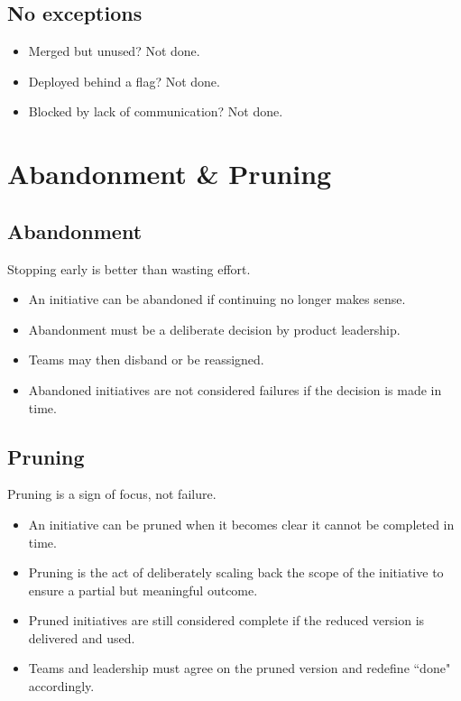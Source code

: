 \documentclass[a4paper]{article}
\begin{document}
\subsection*{No exceptions}

\begin{itemize}
    \item Merged but unused? Not done.
    \item Deployed behind a flag? Not done.
    \item Blocked by lack of communication? Not done.
\end{itemize}


\section{Abandonment \& Pruning}

\subsection*{Abandonment}
Stopping early is better than wasting effort.

\begin{itemize}
    \item An initiative can be abandoned if continuing no longer makes sense.
    \item Abandonment must be a deliberate decision by product leadership.
    \item Teams may then disband or be reassigned.
    \item Abandoned initiatives are not considered failures if the decision is made in time.
\end{itemize}

\subsection*{Pruning}

Pruning is a sign of focus, not failure.

\begin{itemize}
    \item An initiative can be pruned when it becomes clear it cannot be completed in time.
    \item  Pruning is the act of deliberately scaling back the scope of the initiative to ensure a partial but meaningful outcome.
    \item Pruned initiatives are still considered complete if the reduced version is delivered and used.
    \item Teams and leadership must agree on the pruned version and redefine ``done" accordingly.
\end{itemize}
\end{document}

